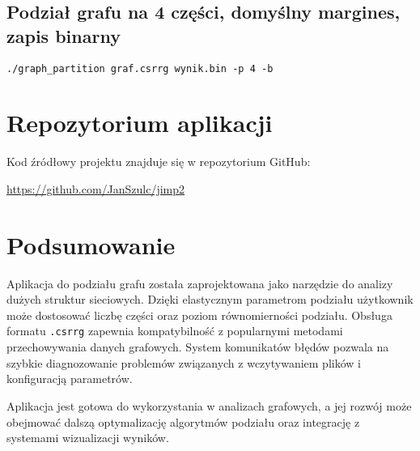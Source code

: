 \documentclass{article}
\begin{document}
\subsection{Podział grafu na 4 części, domyślny margines, zapis binarny}
\begin{verbatim}
./graph_partition graf.csrrg wynik.bin -p 4 -b
\end{verbatim}

\section{Repozytorium aplikacji}
Kod źródłowy projektu znajduje się w repozytorium GitHub:
\begin{center}
\href{https://github.com/JanSzulc/jimp2}{https://github.com/JanSzulc/jimp2}
\end{center}

\section{Podsumowanie}
Aplikacja do podziału grafu została zaprojektowana jako narzędzie do analizy dużych struktur sieciowych. Dzięki elastycznym parametrom podziału użytkownik może dostosować liczbę części oraz poziom równomierności podziału. Obsługa formatu \texttt{.csrrg} zapewnia kompatybilność z popularnymi metodami przechowywania danych grafowych. System komunikatów błędów pozwala na szybkie diagnozowanie problemów związanych z wczytywaniem plików i konfiguracją parametrów. 

Aplikacja jest gotowa do wykorzystania w analizach grafowych, a jej rozwój może obejmować dalszą optymalizację algorytmów podziału oraz integrację z systemami wizualizacji wyników. 
\end{document}

